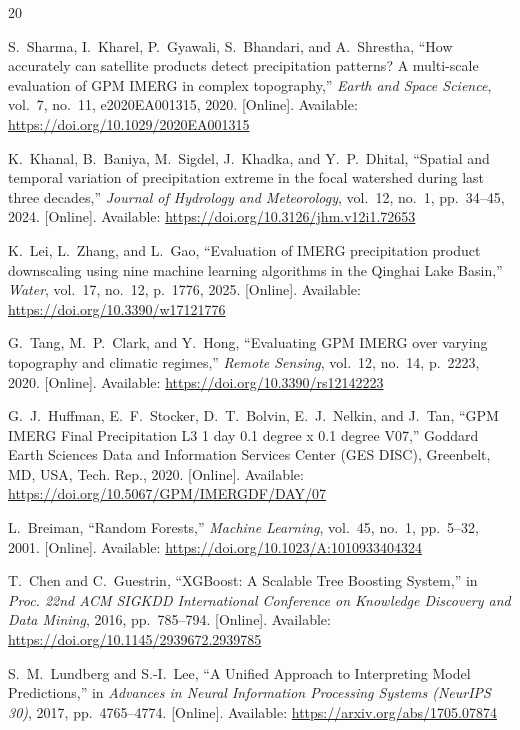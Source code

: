 \documentclass[conference]{IEEEtran}
\begin{document}
\begin{thebibliography}{20}
\raggedright{}

S.~Sharma, I.~Kharel, P.~Gyawali, S.~Bhandari, and A.~Shrestha, ``How accurately can satellite products detect precipitation patterns? A multi-scale evaluation of GPM IMERG in complex topography,'' \emph{Earth and Space Science}, vol.~7, no.~11, e2020EA001315, 2020. [Online]. Available: \url{https://doi.org/10.1029/2020EA001315}

K.~Khanal, B.~Baniya, M.~Sigdel, J.~Khadka, and Y.~P.~Dhital, ``Spatial and temporal variation of precipitation extreme in the focal watershed during last three decades,'' \emph{Journal of Hydrology and Meteorology}, vol.~12, no.~1, pp.~34--45, 2024. [Online]. Available: \url{https://doi.org/10.3126/jhm.v12i1.72653}

K.~Lei, L.~Zhang, and L.~Gao, ``Evaluation of IMERG precipitation product downscaling using nine machine learning algorithms in the Qinghai Lake Basin,'' \emph{Water}, vol.~17, no.~12, p.~1776, 2025. [Online]. Available: \url{https://doi.org/10.3390/w17121776}

G.~Tang, M.~P.~Clark, and Y.~Hong, ``Evaluating GPM IMERG over varying topography and climatic regimes,'' \emph{Remote Sensing}, vol.~12, no.~14, p.~2223, 2020. [Online]. Available: \url{https://doi.org/10.3390/rs12142223}

G.~J.~Huffman, E.~F.~Stocker, D.~T.~Bolvin, E.~J.~Nelkin, and J.~Tan, ``GPM IMERG Final Precipitation L3 1 day 0.1 degree x 0.1 degree V07,'' Goddard Earth Sciences Data and Information Services Center (GES DISC), Greenbelt, MD, USA, Tech. Rep., 2020. [Online]. Available: \url{https://doi.org/10.5067/GPM/IMERGDF/DAY/07}

L.~Breiman, ``Random Forests,'' \emph{Machine Learning}, vol.~45, no.~1, pp.~5--32, 2001. [Online]. Available: \url{https://doi.org/10.1023/A:1010933404324}

T.~Chen and C.~Guestrin, ``XGBoost: A Scalable Tree Boosting System,'' in \emph{Proc. 22nd ACM SIGKDD International Conference on Knowledge Discovery and Data Mining}, 2016, pp.~785--794. [Online]. Available: \url{https://doi.org/10.1145/2939672.2939785}

S.~M.~Lundberg and S.-I.~Lee, ``A Unified Approach to Interpreting Model Predictions,'' in \emph{Advances in Neural Information Processing Systems (NeurIPS 30)}, 2017, pp.~4765--4774. [Online]. Available: \url{https://arxiv.org/abs/1705.07874}


\end{thebibliography}
\end{document}
